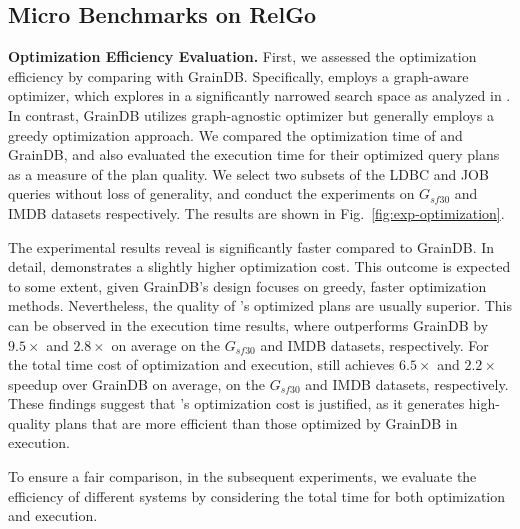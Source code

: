 \subsection{Micro Benchmarks on RelGo}
\label{sec:experiment-opt}

\noindent\textbf{Optimization Efficiency Evaluation.}
First, we assessed the optimization efficiency by comparing \name with GrainDB\cite{graindb}. 
Specifically, \name employs a graph-aware optimizer, which explores in a significantly narrowed search space as analyzed in . 
In contrast, GrainDB utilizes graph-agnostic optimizer but generally employs a greedy optimization approach.
We compared the optimization time of \name and GrainDB, and also evaluated the execution time for their optimized query plans as a measure of the plan quality.
We select two subsets of the LDBC and JOB queries without loss of generality, and conduct the experiments on $G_{sf30}$ and IMDB datasets respectively.
The results are shown in Fig.~\ref{fig:exp-optimization}.

The experimental results reveal \name is significantly faster compared to GrainDB.
In detail, \name demonstrates a slightly higher optimization cost. This outcome is expected to some extent, given GrainDB's design focuses on greedy, faster optimization methods.
Nevertheless, the quality of \name's optimized plans are usually superior. This can be observed in the execution time results, where \name outperforms GrainDB by $9.5\times$ and $2.8\times$ on average on the $G_{sf30}$ and IMDB datasets, respectively.
For the total time cost of optimization and execution, \name still achieves $6.5\times$ and $2.2\times$ speedup over GrainDB on average, on the $G_{sf30}$ and IMDB datasets, respectively.
These findings suggest that \name's optimization cost is justified, as it generates high-quality plans that are more efficient than those optimized by GrainDB in execution.

To ensure a fair comparison, in the subsequent experiments, we evaluate the efficiency of different systems by considering the total time for both optimization and execution.

